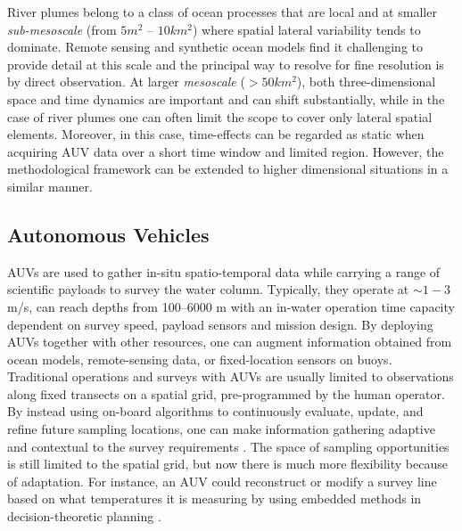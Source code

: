 \documentclass[aoas]{imsart}
\begin{document}


River plumes belong to a class of ocean processes that are local and
at smaller \emph{sub-mesoscale} (from $5 m^2$ -- $10 km^2$) where
spatial lateral variability tends to dominate. Remote sensing and
synthetic ocean models find it challenging to provide detail at this
scale \citep{Lermusiaux:2006} and the principal way to resolve for
fine resolution is by direct observation. At larger \emph{mesoscale}
($>50 km^2$), both three-dimensional space and time dynamics are
important and can shift substantially, while in the case of river
plumes one can often limit the scope to cover only lateral spatial
elements. Moreover, in this case, time-effects can be regarded as
static when acquiring AUV data over a short time window and limited
region. However, the methodological framework can be extended to
higher dimensional situations in a similar manner.

\subsection{Autonomous Vehicles}

AUVs are used to gather in-situ spatio-temporal data while carrying a
range of scientific payloads to survey the water column. Typically,
they operate at $\sim 1-3$ m/s, can reach depths from 100--6000 m with
an in-water operation time capacity dependent on survey speed, payload
sensors and mission design. By deploying AUVs together with other
resources, one can augment information obtained from ocean models,
remote-sensing data, or fixed-location sensors on buoys. Traditional
operations and surveys with AUVs are usually limited to observations
along fixed transects on a spatial grid, pre-programmed by the human
operator. By instead using on-board algorithms to continuously
evaluate, update, and refine future sampling locations, one can make
information gathering adaptive and contextual to the survey
requirements \citep{das11b,fossum18b,fossuminformation}. The space of
sampling opportunities is still limited to the spatial grid, but now
there is much more flexibility because of adaptation. For instance, an
AUV could reconstruct or modify a survey line based on what
temperatures it is measuring by using embedded methods in
decision-theoretic planning \citep{py10,Rajan12,Rajan12b}.
\end{document}
